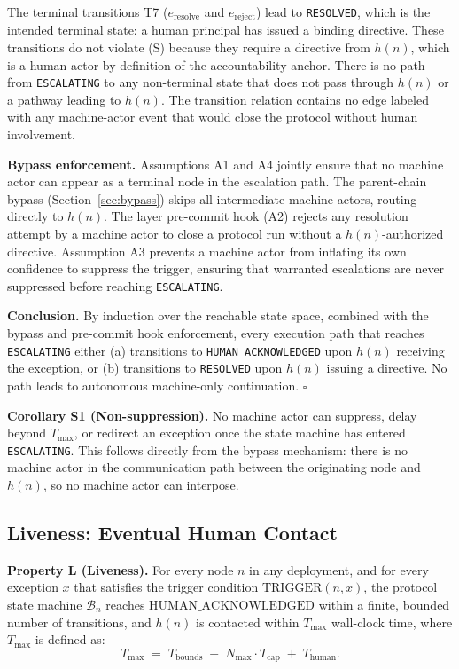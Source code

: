 The terminal transitions T7 ($e_{\text{resolve}}$ and $e_{\text{reject}}$) lead to \texttt{RESOLVED}, which is the intended terminal state: a human principal has issued a binding directive. These transitions do not violate (S) because they require a directive from $h(n)$, which is a human actor by definition of the accountability anchor. There is no path from \texttt{ESCALATING} to any non-terminal state that does not pass through $h(n)$ or a pathway leading to $h(n)$. The transition relation contains no edge labeled with any machine-actor event that would close the protocol without human involvement.

\textbf{Bypass enforcement.} Assumptions A1 and A4 jointly ensure that no machine actor can appear as a terminal node in the escalation path. The parent-chain bypass (Section~\ref{sec:bypass}) skips all intermediate machine actors, routing directly to $h(n)$. The \fact{} layer pre-commit hook (A2) rejects any resolution attempt by a machine actor to close a protocol run without a $h(n)$-authorized directive. Assumption A3 prevents a machine actor from inflating its own confidence to suppress the trigger, ensuring that warranted escalations are never suppressed before reaching \texttt{ESCALATING}.

\textbf{Conclusion.} By induction over the reachable state space, combined with the bypass and pre-commit hook enforcement, every execution path that reaches \texttt{ESCALATING} either (a) transitions to \texttt{HUMAN\_ACKNOWLEDGED} upon $h(n)$ receiving the exception, or (b) transitions to \texttt{RESOLVED} upon $h(n)$ issuing a directive. No path leads to autonomous machine-only continuation. $\square$

\bigskip
\noindent\textbf{Corollary S1 (Non-suppression).} No machine actor can suppress, delay beyond $T_{\max}$, or redirect an exception once the state machine has entered \texttt{ESCALATING}. This follows directly from the bypass mechanism: there is no machine actor in the communication path between the originating node and $h(n)$, so no machine actor can interpose.

\subsection{Liveness: Eventual Human Contact}\label{sec:liveness}

\textbf{Property L (Liveness).} For every node $n$ in any \bxthree{} deployment, and for every exception $x$ that satisfies the trigger condition $\text{TRIGGER}(n, x)$, the protocol state machine $\mathcal{B}_n$ reaches $\text{HUMAN\_ACKNOWLEDGED}$ within a finite, bounded number of transitions, and $h(n)$ is contacted within $T_{\max}$ wall-clock time, where $T_{\max}$ is defined as:
\[
T_{\max} \;=\; T_{\text{bounds}} \;+\; N_{\max} \cdot T_{\text{cap}} \;+\; T_{\text{human}}.
\tag{T-max}
\]

